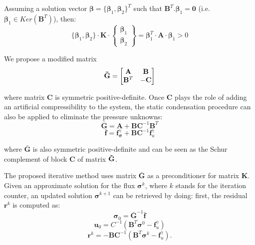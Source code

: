 \documentclass{wccm2024}
\begin{document}
Assuming a solution vector $\boldsymbol{\beta}=\{\boldsymbol{\beta}_1, \boldsymbol{\beta}_2\}^T$ such that $\mathbf{B}^T . \boldsymbol{\beta}_1 = \mathbf{0}$ (i.e. $\boldsymbol{\beta}_1 \in Ker\left( \mathbf{B}^T \right)$), then:
\vskip -0.3cm
\begin{equation}
    \{\boldsymbol{\beta}_1, \boldsymbol{\beta}_2\} \cdot \mathbf{K} \cdot 
    \begin{Bmatrix}
        \boldsymbol{\beta}_1 \\
        \boldsymbol{\beta}_2
    \end{Bmatrix}
    = \boldsymbol{\beta}_1^T \cdot \mathbf{A} \cdot \boldsymbol{\beta}_1 > 0
\end{equation}

We propose a modified matrix
\vskip -0.3cm
\begin{equation}
    \mathbf{\Tilde{G}} =
    \begin{bmatrix}
        \mathbf{A} & \mathbf{B} \\
        \mathbf{B}^T & -\mathbf{C}
    \end{bmatrix}
\end{equation}

\noindent where matrix $\mathbf{C}$ is symmetric positive-definite. Once $\mathbf{C}$ plays the role of adding an artificial compressibility to the system, the static condensation procedure can also be applied to eliminate the pressure unknowns:
\vskip -0.3cm
\begin{equation}
    \bar{\mathbf{G}} = \mathbf{A} + \mathbf{B}\mathbf{C}^{-1}\mathbf{B}^T
\end{equation}
\vskip -0.3cm
\begin{equation}
    \bar{\mathbf{f}} = \mathbf{f}^\gamma_{\boldsymbol{\sigma}} + \mathbf{B}\mathbf{C}^{-1}\mathbf{f}^\gamma_{u}
\end{equation}

\noindent where $\bar{\mathbf{G}}$ is also symmetric positive-definite and can be seen as the Schur complement of block $\mathbf{C}$ of matrix $\mathbf{\Tilde{G}}$. 

The proposed iterative method uses matrix $\bar{\mathbf{G}}$ as a preconditioner for matrix $\mathbf{K}$. Given an approximate solution for the flux $\boldsymbol{\sigma}^k$, where $k$ stands for the iteration counter, an updated solution $\boldsymbol{\sigma}^{k+1}$ can be retrieved by doing: first, the residual $\mathbf{r}^{k}$ is computed as:
\begin{equation}
\boldsymbol{\sigma}_0 = \bar{\mathbf{G}}^{-1}\bar{\mathbf{f}}
\end{equation}
\begin{equation}
\mathbf{u}_0 = C^{-1}\left(\mathbf{B}^T \boldsymbol{\sigma}^0-\mathbf{f}_u^\gamma\right)
\end{equation}
\vskip -0.3cm
\begin{equation}
    \mathbf{r}^{k} = - \mathbf{B}\mathbf{C}^{-1}\left(\mathbf{B}^T \boldsymbol{\sigma}^k-\mathbf{f}_u^\gamma \right) .
\end{equation}
\end{document}
